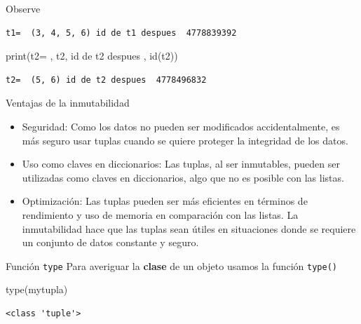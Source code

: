 \documentclass[
  ignorenonframetext,
  aspectratio=169,
  spanish,
]{beamer}
\newenvironment{Shaded}{\begin{snugshade}}{\end{snugshade}}
\newcommand{\BuiltInTok}[1]{\textcolor[rgb]{0.00,0.23,0.31}{#1}}
\newcommand{\NormalTok}[1]{\textcolor[rgb]{0.00,0.23,0.31}{#1}}
\newcommand{\StringTok}[1]{\textcolor[rgb]{0.13,0.47,0.30}{#1}}
\begin{document}
\begin{frame}[fragile]{Observe}
\begin{verbatim}
t1=  (3, 4, 5, 6) id de t1 despues  4778839392
\end{verbatim}

\begin{Shaded}
\begin{Highlighting}[]
\BuiltInTok{print}\NormalTok{(}\StringTok{\textquotesingle{}t2= \textquotesingle{}}\NormalTok{, t2, }\StringTok{\textquotesingle{}id de t2 despues \textquotesingle{}}\NormalTok{, }\BuiltInTok{id}\NormalTok{(t2))}
\end{Highlighting}
\end{Shaded}

\begin{verbatim}
t2=  (5, 6) id de t2 despues  4778496832
\end{verbatim}
\end{frame}

\begin{frame}{Ventajas de la inmutabilidad}
\label{ventajas-de-la-inmutabilidad}
\begin{itemize}
\item
  Seguridad: Como los datos no pueden ser modificados accidentalmente,
  es más seguro usar tuplas cuando se quiere proteger la integridad de
  los datos.
\item
  Uso como claves en diccionarios: Las tuplas, al ser inmutables, pueden
  ser utilizadas como claves en diccionarios, algo que no es posible con
  las listas.
\item
  Optimización: Las tuplas pueden ser más eficientes en términos de
  rendimiento y uso de memoria en comparación con las listas. La
  inmutabilidad hace que las tuplas sean útiles en situaciones donde se
  requiere un conjunto de datos constante y seguro.
\end{itemize}
\end{frame}

\begin{frame}[fragile]{Función \texttt{type}}
\label{funciuxf3n-type}
Para averiguar la \textbf{clase} de un objeto usamos la función
\texttt{type()}

\begin{Shaded}
\begin{Highlighting}[]
\BuiltInTok{type}\NormalTok{(mytupla) }
\end{Highlighting}
\end{Shaded}

\begin{verbatim}
<class 'tuple'>
\end{verbatim}
\end{frame}
\end{document}
